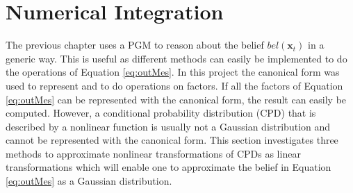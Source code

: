 \documentclass[12pt,oneside,openany,a4paper, %
afrikaans,english,
]{memoir}
\numberwithin{equation}{chapter}
\begin{document}
\chapter{Numerical Integration}\label{sec:numInt}
The previous chapter uses a PGM to reason about the belief $bel(\bm{x}_t)$ in a generic way. This is useful as different methods can easily be implemented to do the operations of Equation \ref{eq:outMes}. In this project the canonical form was used to represent and to do operations on factors. If all the factors of Equation \ref{eq:outMes} can be represented with the canonical form, the result can easily be computed. However, a conditional probability distribution (CPD) that is described by a nonlinear function is usually not a Gaussian distribution and cannot be represented with the canonical form. This section investigates three methods to approximate nonlinear transformations of CPDs as linear transformations which will enable one to approximate the belief in Equation \ref{eq:outMes} as a Gaussian distribution.
\end{document}
